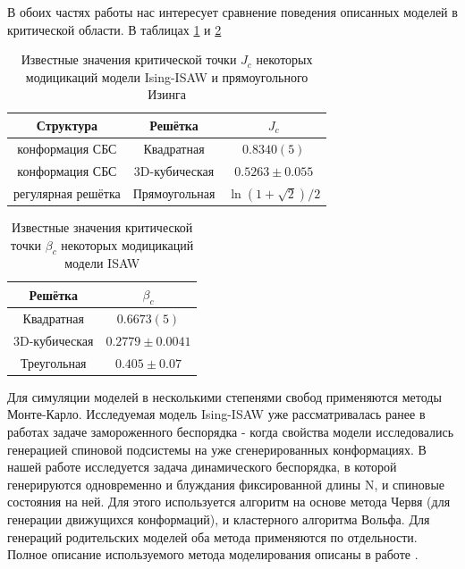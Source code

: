 В обоих частях работы нас интересует сравнение поведения описанных моделей в критической области.
В таблицах \ref{tab:Ising_T_c} и \ref{tab:ISAW_T_c}


\begin{table}[h]
    \centering
    \begin{tabular}{|c|c|c|}
        \hline
        Структура & Решётка & $J_{c}$ \\ \hline
        конформация СБС & Квадратная & $0.8340(5)$\cite{faizullina2021critical} \\ \hline
        конформация СБС & 3D-кубическая & $0.5263 \pm 0.055$\cite{foster2021critical}\\ \hline
        регулярная решётка & Прямоугольная & $\ln{(1 + \sqrt{2}) / 2}$\cite{Onsager}\\ \hline
    \end{tabular}
    \caption{Известные значения критической точки $J_c$ некоторых модицикаций модели Ising-ISAW и прямоугольного Изинга}
    \label{tab:Ising_T_c}
\end{table}

\begin{table}[h]
    \centering
    \begin{tabular}{|c|c|}
        \hline
        Решётка & $\beta_{c}$ \\ \hline
        Квадратная & $0.6673(5)$ \cite{caracciolo2011geometrical} \\ \hline
        3D-кубическая & $0.2779 \pm 0.0041$\cite{Tesi1996} \\ \hline
        Треугольная & $ 0.405 \pm 0.07$\cite{Privman1986} \\ \hline
    \end{tabular}
    \caption{Известные значения критической точки $\beta_c$ некоторых модицикаций модели ISAW}
    \label{tab:ISAW_T_c}
\end{table}

Для симуляции моделей в несколькими степенями свобод применяются методы Монте-Карло.
Исследуемая модель Ising-ISAW уже рассматривалась ранее в работах \cite{Garel1999, Papale2018} задаче замороженного беспорядка - когда свойства модели исследовались генерацией спиновой подсистемы на уже сгенерированных конформациях.
В нашей работе исследуется задача динамического беспорядка, в которой генерируются одновременно и блуждания фиксированной длины N, и спиновые состояния на ней.
Для этого используется алгоритм на основе метода Червя (для генерации движущихся конформаций), и кластерного алгоритма Вольфа. 
Для генераций родительских моделей оба метода применяются по отдельности.
Полное описание используемого метода моделирования описаны в работе \cite{faizullina2021critical}.



